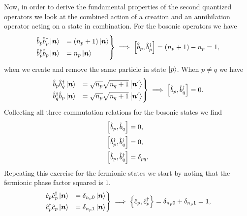             Now, in order to derive the fundamental properties of the second
            quantized operators we look at the combined action of a creation and
            an annihilation operator acting on a state in combination.
            For the bosonic operators we have
            \begin{align}
                \begin{drcases}
                    \ban{p}\bcr{p}\ket{\vfg{n}}
                    &= (n_p + 1)\ket{\vfg{n}}
                    \\
                    \bcr{p}\ban{p}\ket{\vfg{n}}
                    &= n_p \ket{\vfg{n}}
                \end{drcases}
                \implies
                \com{\ban{p}}{\bcr{p}}
                = (n_p + 1) - n_p = 1,
            \end{align}
            when we create and remove the same particle in state $\ket{p}$.
            When $p \neq q$ we have
            \begin{align}
                \begin{drcases}
                    \ban{p}\bcr{q}\ket{\vfg{n}}
                    &= \sqrt{n_p}\sqrt{n_q + 1}\ket{\vfg{n}'}
                    \\
                    \bcr{q}\ban{p}\ket{\vfg{n}}
                    &= \sqrt{n_p}\sqrt{n_q + 1}\ket{\vfg{n}'}
                \end{drcases}
                \implies
                \com{\ban{p}}{\bcr{q}}
                = 0.
            \end{align}
            Collecting all three commutation relations for the bosonic states we
            find
            \begin{align}
                \left[\hat{b}_{p}, \hat{b}_{q}\right] &= 0, \\
                \left[\hat{b}_{p}^{\dagger}, \hat{b}_{q}^{\dagger}\right] &= 0, \\
                \left[\hat{b}_{p}, \hat{b}_{q}^{\dagger}\right] &= \delta_{pq}.
            \end{align}
            Repeating this exercise for the fermionic states we start by noting
            that the fermionic phase factor squared is $1$.
            \begin{align}
                \begin{drcases}
                    \can{p}\ccr{p}\ket{\vfg{n}}
                    &= \delta_{n_p0}\ket{\vfg{n}}
                    \\
                    \ccr{p}\can{p}\ket{\vfg{n}}
                    &= \delta_{n_p1}\ket{\vfg{n}}
                \end{drcases}
                \implies
                \acom{\can{p}}{\ccr{p}}
                = \delta_{n_p 0} + \delta_{n_p 1}
                = 1,
            \end{align}
